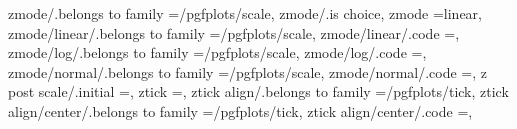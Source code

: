 {{{zmode/.belongs to family                                           =/pgfplots/scale,                                                                                                                   
zmode/.is choice,
zmode                                                              =linear,                                                                                                                            
zmode/linear/.belongs to family                                    =/pgfplots/scale,                                                                                                                   
zmode/linear/.code                                                 ={\pgfplots@zislineartrue},                                                                                                         
zmode/log/.belongs to family                                       =/pgfplots/scale,                                                                                                                   
zmode/log/.code                                                    ={\pgfplots@zislinearfalse},                                                                                                        
zmode/normal/.belongs to family                                    =/pgfplots/scale,                                                                                                                   
zmode/normal/.code                                                 ={\pgfplots@zislineartrue},                                                                                                         
z post scale/.initial                                              =,                                                                                                                                  
ztick                                                              =,                                                                                                                                  
ztick align/.belongs to family                                     =/pgfplots/tick,                                                                                                                    
ztick align/center/.belongs to family                              =/pgfplots/tick,                                                                                                                    
ztick align/center/.code                                           ={\def\pgfplots@ztickalignnum{2}},                                                                                                  
}}}
